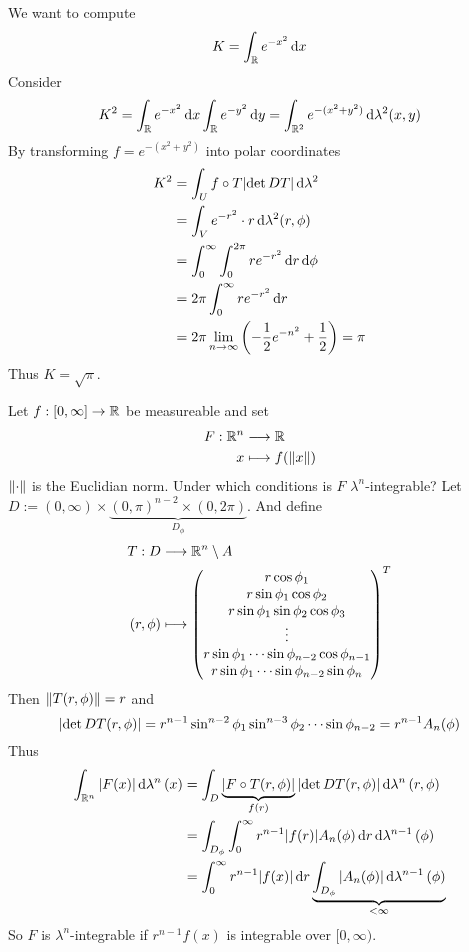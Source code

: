 \documentclass[../../script.tex]{subfiles}
\begin{document}
\begin{eg}
    We want to compute 
    \[
        K = \int_{\mathbb{R}} e^{-x^2} \dd{x}
    \]
    Consider 
    \[
        K^2 = \int_{\mathbb{R}} e^{-x^2} \dd{x} \int_{\mathbb{R}} e^{-y^2} \dd{y} = \int_{\mathbb{R}^2} e^{-(x^2 + y^2)} \dd{\lambda^2(x, y)}
    \]
    By transforming $f = e^{-(x^2 + y^2)}$ into polar coordinates 
    \begin{align*}
        K^2 &= \int_U f \circ T \abs{\det DT} \dd{\lambda^2} \\
        &= \int_V e^{-r^2} \cdot r \dd{\lambda^2(r, \phi)} \\
        &= \int_0^{\infty} \int_0^{2\pi} r e^{-r^2} \dd{r}\dd{\phi} \\
        &= 2\pi \int_0^{\infty} r e^{-r^2} \dd{r} \\
        &= 2\pi \lim_{n \rightarrow \infty}\left(-\frac{1}{2} e^{-n^2} + \frac{1}{2}\right) = \pi
    \end{align*}
    Thus $K = \sqrt{\pi}$.
\end{eg}

\begin{eg}
    Let $f: [0, \infty] \rightarrow \mathbb{R}$ be measureable and set 
    \begin{align*}
        F: \mathbb{R}^n &\longrightarrow \mathbb{R} \\
        x &\longmapsto f(\norm{x})
    \end{align*}
    $\norm{\cdot}$ is the Euclidian norm. Under which conditions is $F$ $\lambda^n$-integrable?
    Let $D := (0, \infty) \times \underbrace{(0, \pi)^{n-2} \times (0, 2\pi)}_{D_{\phi}}$. And define 
    \begin{align*}
        T: D &\longrightarrow \mathbb{R}^n \setminus A \\
        (r, \phi) &\longmapsto \begin{pmatrix}
            r \cos\phi_1 \\
            r \sin\phi_1 \cos\phi_2 \\
            r \sin\phi_1 \sin\phi_2 \cos\phi_3 \\
            \vdots \\
            r \sin\phi_1 \cdots \sin\phi_{n-2} \cos\phi_{n-1} \\
            r \sin\phi_1 \cdots \sin\phi_{n-2} \sin\phi_n
        \end{pmatrix}^T
    \end{align*}
    Then $\norm{T(r, \phi)} = r$ and 
    \[
        \abs{\det DT(r, \phi)} = r^{n-1} \sin^{n-2}\phi_1 \sin^{n-3} \phi_2 \cdots \sin\phi_{n-2} = r^{n-1} A_n(\phi)
    \]
    Thus 
    \begin{align*}
        \int_{\mathbb{R}^n} \abs{F(x)} \dd{\lambda^n}(x) &= \int_D \underbrace{\abs{F \circ T(r, \phi)}}_{f(r)} \abs{\det DT(r, \phi)} \dd{\lambda^n}(r, \phi) \\
        &= \int_{D_{\phi}} \int_0^{\infty} r^{n-1} \abs{f(r)} A_n(\phi) \dd{r} \dd{\lambda^{n-1}}(\phi) \\
        &= \int_0^{\infty} r^{n-1} \abs{f(x)} \dd{r} \underbrace{\int_{D_{\phi}} \abs{A_n(\phi)} \dd{\lambda^{n-1}}(\phi)}_{< \infty}
    \end{align*}
    So $F$ is $\lambda^n$-integrable if $r^{n-1} f(x)$  is integrable over $[0, \infty)$.
\end{eg}
\end{document}
